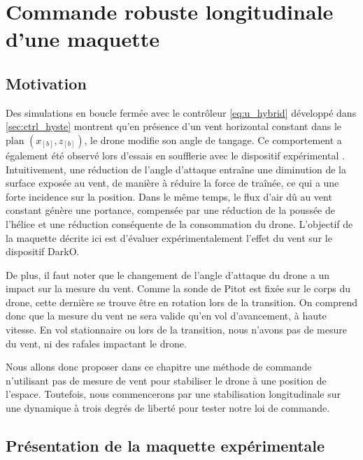\chapter{Commande robuste longitudinale d'une maquette}
\minitoc
\label{chap:3DOF}

\section{Motivation}
\label{sec:motivation3DOF}
Des simulations en boucle fermée avec le contrôleur \eqref{eq:u_hybrid} développé dans \ref{sec:ctrl_hyste} montrent qu'en présence d'un vent horizontal constant dans le plan $(x_{[b]},z_{[b]})$, le drone modifie son angle de tangage. Ce comportement a également été observé lors d'essais en soufflerie avec le dispositif expérimental \cite{olszaneckibarthHal-02542982}. Intuitivement, une réduction de l'angle d'attaque entraîne une diminution de la surface exposée au vent, de manière à réduire la force de traînée, ce qui a une forte incidence sur la position. Dans le même temps, le flux d'air dû au vent constant génère une portance, compensée par une réduction de la poussée de l'hélice et une réduction conséquente de la consommation du drone. L'objectif de la maquette décrite ici est d'évaluer expérimentalement l'effet du vent sur le dispositif DarkO.

De plus, il faut noter que le changement de l'angle d'attaque du drone a un impact sur la mesure du vent. Comme la sonde de Pitot est fixée sur le corps du drone, cette dernière se trouve être en rotation lors de la transition. On comprend donc que la mesure du vent ne sera valide qu'en vol d'avancement, à haute vitesse. En vol stationnaire ou lors de la transition, nous n'avons pas de mesure du vent, ni des rafales impactant le drone.

Nous allons donc proposer dans ce chapitre une méthode de commande n'utilisant pas de mesure de vent pour stabiliser le drone à une position de l'espace. Toutefois, nous commencerons par une stabilisation longitudinale sur une dynamique à trois degrés de liberté pour tester notre loi de commande.

\section{Présentation de la maquette expérimentale}
\label{sec:test_bench}



